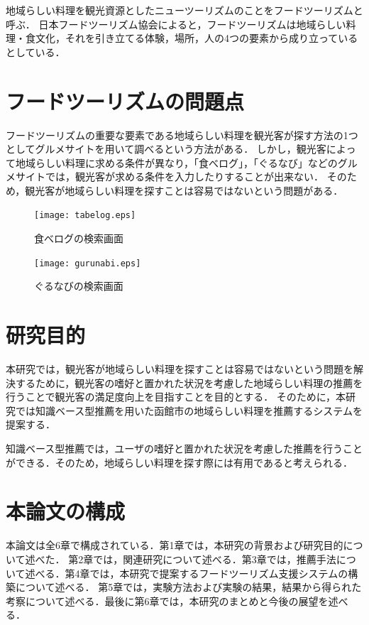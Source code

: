 \documentclass{funthesis}
\begin{document}
地域らしい料理を観光資源としたニューツーリズムのことをフードツーリズムと呼ぶ．
日本フードツーリズム協会によると，フードツーリズムは地域らしい料理・食文化，それを引き立てる体験，場所，人の4つの要素から成り立っているとしている\cite{3}．

\section{フードツーリズムの問題点}
フードツーリズムの重要な要素である地域らしい料理を観光客が探す方法の1つとしてグルメサイトを用いて調べるという方法がある．
しかし，観光客によって地域らしい料理に求める条件が異なり，「食べログ」\cite{4}，「ぐるなび」\cite{5}などのグルメサイトでは，観光客が求める条件を入力したりすることが出来ない．
そのため，観光客が地域らしい料理を探すことは容易ではないという問題がある．

\begin{figure}[bp]
  \begin{center}
    \texttt{[image: tabelog.eps]}
    \caption[食べログの検索画面]{食べログの検索画面\cite{4}}
  \end{center}
\end{figure}

\begin{figure}[tbp]
  \begin{center}
    \texttt{[image: gurunabi.eps]}
    \caption[ぐるなびの検索画面]{ぐるなびの検索画面\cite{5}}
  \end{center}
\end{figure}

\section{研究目的}  
本研究では，観光客が地域らしい料理を探すことは容易ではないという問題を解決するために，観光客の嗜好と置かれた状況を考慮した地域らしい料理の推薦を行うことで観光客の満足度向上を目指すことを目的とする．
そのために，本研究では知識ベース型推薦を用いた函館市の地域らしい料理を推薦するシステムを提案する．

知識ベース型推薦では，ユーザの嗜好と置かれた状況を考慮した推薦を行うことができる．そのため，地域らしい料理を探す際には有用であると考えられる．

\section{本論文の構成}
本論文は全6章で構成されている．第1章では，本研究の背景および研究目的について述べた．
第2章では，関連研究について述べる．第3章では，推薦手法について述べる．第4章では，本研究で提案するフードツーリズム支援システムの構築について述べる．
第5章では，実験方法および実験の結果，結果から得られた考察について述べる．最後に第6章では，本研究のまとめと今後の展望を述べる．
\end{document}
